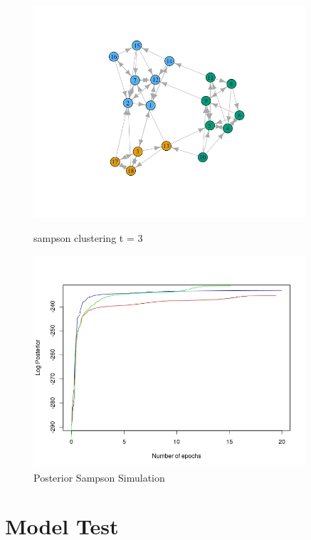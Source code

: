 \documentclass[12pt]{ociamthesis}  %
\begin{document}
	\begin{figure}[H]
		\centering
		\begin{minipage}{0.45\textwidth}
			\centering
			\includegraphics[width=0.9\textwidth]{sampsonEM3} %
			\caption{sampson clustering t = 3}
			\label{label-image21}
		\end{minipage}\hfill
		\begin{minipage}{0.45\textwidth}
			\centering
			\includegraphics[width=0.9\textwidth]{posteriorSampson} %
			\caption{Posterior Sampson Simulation}
			\label{label-image22}
		\end{minipage}
	\end{figure}
	
	\chapter{Model Test}
	
\end{document}
